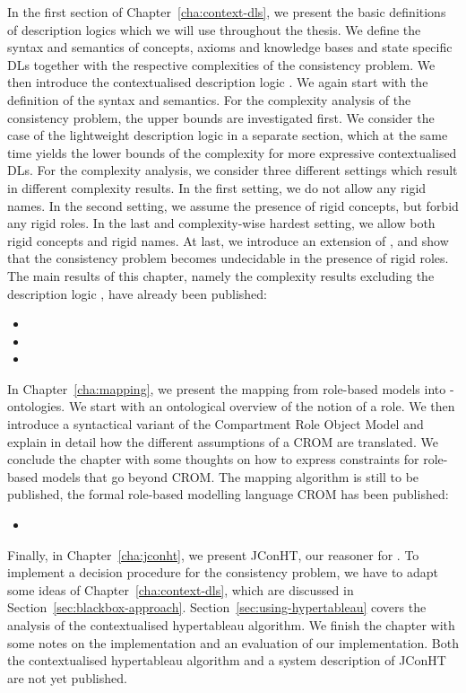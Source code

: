 In the first section of Chapter~\ref{cha:context-dls}, we present the basic definitions of
description logics which we will use throughout the thesis. We define the syntax and semantics of
concepts, axioms and knowledge bases and state specific DLs together with the respective
complexities of the consistency problem.
%
We then introduce the contextualised description logic \LMLO. We again start with the definition of
the syntax and semantics. For the complexity analysis of the consistency problem, the upper bounds
are investigated first. We consider the case of the lightweight description logic \EL in a separate
section, which at the same time yields the lower bounds of the complexity for more expressive
contextualised DLs. For the complexity analysis, we consider three different settings which result in
different complexity results. In the first setting, we do not allow any rigid names.  In the
second setting, we assume the presence of rigid concepts, but forbid any rigid roles. In the
last and complexity-wise hardest setting, we allow both rigid concepts and rigid names.
%
At last, we introduce an extension of \LMLO, and show that the consistency problem becomes
undecidable in the presence of rigid roles. The main results of this chapter, namely the complexity
results excluding the description logic \SHOIQ, have already been published:
\begin{itemize}
\item {}
\item {}
\item {}
\end{itemize}


In Chapter~\ref{cha:mapping}, we present the mapping from role-based models into
\LMLO-ontologies. We start with an ontological overview of the notion of a role.  We then introduce
a syntactical variant of the Compartment Role Object Model and explain in detail how the different
assumptions of a CROM are translated.  We conclude the chapter with some thoughts on how to express
constraints for role-based models that go beyond CROM. The mapping algorithm is still to be
published, the formal role-based modelling language CROM has been published:
\begin{itemize}
\item {}
\end{itemize}


Finally, in Chapter~\ref{cha:jconht}, we present JConHT, our reasoner for \LMLO. To implement a decision
procedure for the consistency problem, we have to adapt some ideas of Chapter~\ref{cha:context-dls},
which are discussed in Section~\ref{sec:blackbox-approach}. Section~\ref{sec:using-hypertableau}
covers the analysis of the contextualised hypertableau algorithm. We finish the chapter with some
notes on the implementation and an evaluation of our implementation. Both the contextualised
hypertableau algorithm and a system description
of JConHT are not yet published.


